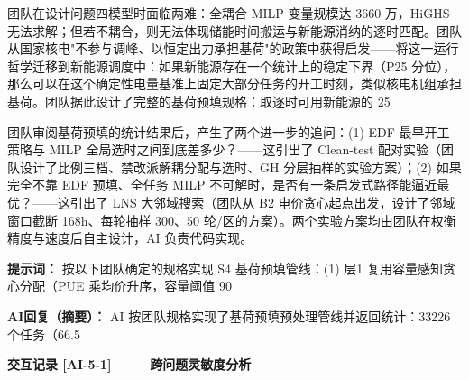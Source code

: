 团队在设计问题四模型时面临两难：全耦合 MILP 变量规模达 3660 万，HiGHS 无法求解；但若不耦合，则无法体现储能时间搬运与新能源消纳的逐时匹配。团队从国家核电"不参与调峰、以恒定出力承担基荷"的政策中获得启发——将这一运行哲学迁移到新能源调度中：如果新能源存在一个统计上的稳定下界（P25 分位），那么可以在这个确定性电量基准上固定大部分任务的开工时刻，类似核电机组承担基荷。团队据此设计了完整的基荷预填规格：取逐时可用新能源的 25%

团队审阅基荷预填的统计结果后，产生了两个进一步的追问：(1) EDF 最早开工策略与 MILP 全局选时之间到底差多少？——这引出了 Clean-test 配对实验（团队设计了比例三档、禁改派解耦分配与选时、GH 分层抽样的实验方案）；(2) 如果完全不靠 EDF 预填、全任务 MILP 不可解时，是否有一条启发式路径能逼近最优？——这引出了 LNS 大邻域搜索（团队从 B2 电价贪心起点出发，设计了邻域窗口截断 168h、每轮抽样 300、50 轮/区的方案）。两个实验方案均由团队在权衡精度与速度后自主设计，AI 负责代码实现。

\textbf{提示词：} 按以下团队确定的规格实现 S4 基荷预填管线：(1) 层1 复用容量感知贪心分配（PUE 乘均价升序，容量阈值 90%

\textbf{AI回复（摘要）：} AI 按团队规格实现了基荷预填预处理管线并返回统计：33226 个任务（66.5%

\vspace{1em}
\textbf{交互记录 [AI-5-1] —— 跨问题灵敏度分析}

